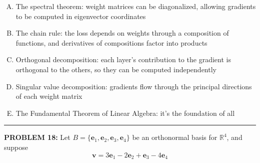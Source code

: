 \documentclass[12pt]{amsart}
\newcommand{\divider}{
  \vspace{-1em} %
  \noindent
  \raisebox{-0.15ex}{\textbullet}%
  \hspace{0.5em}%
  \rule[0.5ex]{0.95\textwidth}{1.0pt}%
  \hspace{0.5em}%
  \raisebox{-0.15ex}{\textbullet}%
  \vspace{0em} %
}
\begin{document}
{\begin{enumerate}[(A)]
\item The spectral theorem: weight matrices can be diagonalized, allowing gradients to be computed in eigenvector coordinates
\item The chain rule: the loss depends on weights through a composition of functions, and derivatives of compositions factor into products
\item Orthogonal decomposition: each layer's contribution to the gradient is orthogonal to the others, so they can be computed independently
\item Singular value decomposition: gradients flow through the principal directions of each weight matrix
\item The Fundamental Theorem of Linear Algebra: it's the foundation of all
\end{enumerate}

%

\divider

{\bf PROBLEM 18:}
% 
Let $B = \{\mathbf{e}_1, \mathbf{e}_2, \mathbf{e}_3, \mathbf{e}_4\}$ be an orthonormal basis for $\mathbb{R}^4$, and suppose
$$\mathbf{v} = 3\mathbf{e}_1 - 2\mathbf{e}_2 + \mathbf{e}_3 - 4\mathbf{e}_4$$

}
\end{document}
